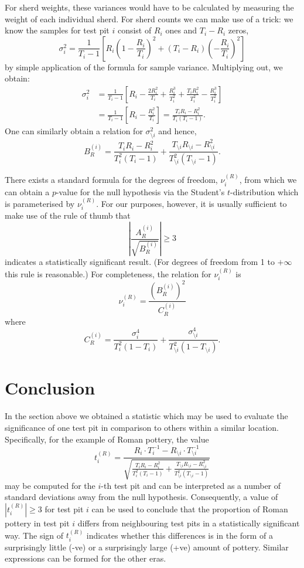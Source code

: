 \documentclass[conference]{IEEEtran}
\begin{document}
For sherd weights, these variances would have to be calculated by measuring the
weight of each individual sherd. For sherd counts we can make use of a trick: we
know the samples for test pit $i$ consist of $R_i$ ones and $T_i-R_i$ zeros,
\[
    \sigma^2_i = \frac{1}{T_i-1} \left[
        R_i\left(1-\frac{R_i}{T_i}\right)^2 +
    (T_i-R_i)\left(-\frac{R_i}{T_i}\right)^2 \right]
\]
by simple application of the formula for sample variance. Multiplying out, we
obtain:
\begin{align*}
    \sigma^2_i &= \frac{1}{T_i-1} \left[
        R_i - \frac{2R_i^2}{T_i} + \frac{R_i^3}{T_i^2} +
        \frac{T_iR_i^2}{T_i^2} - \frac{R_i^3}{T_i^2}
    \right] \\
    &= \frac{1}{T_i-1} \left[
        R_i - \frac{R_i^2}{T_i} 
    \right] =
    \frac{T_i R_i - R_i^2}{T_i(T_i-1)}.
\end{align*}
One can similarly obtain a relation for $\sigma^2_{\setminus i}$ and hence,
\[
    B^{(i)}_R =
    \frac{T_i R_i - R_i^2}{T^2_i(T_i-1)} +
    \frac{T_{\setminus i} R_{\setminus i} - R_{\setminus i}^2}{T^2_{\setminus
    i}(T_{\setminus i}-1)}.
\]

There exists a standard formula\cite{welch} for the degrees of freedom, $\nu^{(R)}_i$, from
which we can obtain a $p$-value for the null hypothesis via the Student's
$t$-distribution which is parameterised by $\nu^{(R)}_i$. For our purposes,
however, it is usually sufficient to make use of the rule of thumb that
\[
    \left|\frac{A^{(i)}_R}{\sqrt{B^{(i)}_R}}\right| \ge 3
\]
indicates a statistically significant result. (For degrees of freedom from 1 to
$+\infty$ this rule is reasonable.) For completeness, the relation for
$\nu^{(R)}_i$ is
\[
    \nu^{(R)}_i = \frac{\left( B^{(i)}_R \right)^2}{C^{(i)}_R}
\]
where
\[
    C^{(i)}_R = \frac{\sigma^4_i}{T_i^2 (1-T_i)} + \frac{\sigma^4_{\setminus
    i}}{T_{\setminus i}^2 (1-T_{\setminus i})}.
\]

\section{Conclusion}

In the section above we obtained a statistic which may be used to evaluate the
significance of one test pit in comparison to others within a similar location.
Specifically, for the example of Roman pottery, the value
\[
    t^{(R)}_i = \frac{R_i \cdot T^{-1}_i - R_{\setminus i} \cdot T^{-1}_{\setminus
    i}}{\sqrt{
    \frac{T_i R_i - R_i^2}{T^2_i(T_i-1)} +
    \frac{T_{\setminus i} R_{\setminus i} - R_{\setminus i}^2}{T^2_{\setminus
    i}(T_{\setminus i}-1)}}}
\]
may be computed for the $i$-th test pit and can be interpreted as a number of
standard deviations away from the null hypothesis. Consequently, a value of
$|t^{(R)}_i| \ge 3$ for test pit $i$ can be used to conclude that the proportion
of Roman pottery in test pit $i$ differs from neighbouring test pits in a
statistically significant way. The sign of $t^{(R)}_i$ indicates whether this
differences is in the form of a surprisingly little (-ve) or a surprisingly
large (+ve) amount of pottery. Similar expressions can be formed for the other
eras.
\end{document}

